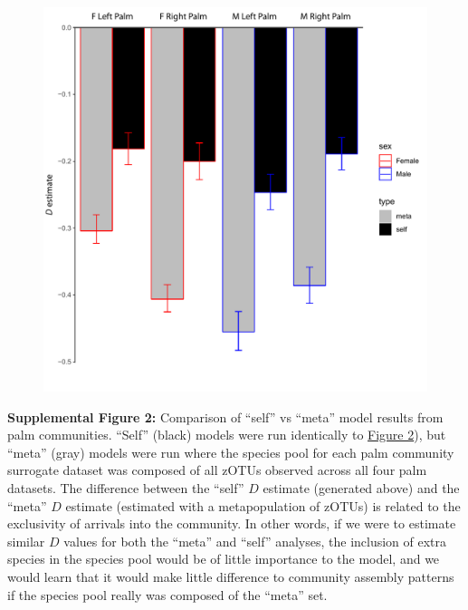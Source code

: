 \documentclass{article}
\begin{document}
{\begin{figure}[t]
	\centering
	\includegraphics[scale=0.80]{figs/Fig_S2.pdf}
\end{figure}
\textbf{Supplemental Figure 2:}\label{sec:figureS2} Comparison of “self” vs “meta” model results from palm communities. “Self” (black) models were run identically to \hyperref[sec:figure2]{Figure 2}), but “meta” (gray) models were run where the species pool for each palm community surrogate dataset was composed of all zOTUs observed across all four palm datasets. The difference between the “self” \(D\) estimate (generated above) and the “meta” \(D\) estimate (estimated with a metapopulation of zOTUs) is related to the exclusivity of arrivals into the community. In other words, if we were to estimate similar \(D\) values for both the “meta” and “self” analyses, the inclusion of extra species in the species pool would be of little importance to the model, and we would learn that it would make little difference to community assembly patterns if the species pool really was composed of the “meta” set.
\newpage

}
\end{document}
